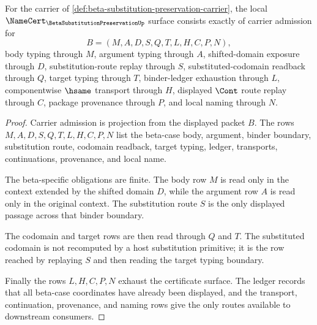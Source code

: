 \begin{theorem}
\label{thm:beta-substitution-preservation-namecert-obligations}
For the carrier of \autoref{def:beta-substitution-preservation-carrier}, the local $\NameCert_{\BetaSubstitutionPreservationUp}$ surface consists exactly of carrier admission for
$$
B=(M,A,D,S,Q,T,L,H,C,P,N),
$$
body typing through $M$, argument typing through $A$, shifted-domain exposure through $D$, substitution-route replay through $S$, substituted-codomain readback through $Q$, target typing through $T$, binder-ledger exhaustion through $L$, componentwise $\hsame$ transport through $H$, displayed $\Cont$ route replay through $C$, package provenance through $P$, and local naming through $N$.
\end{theorem}
\begin{proof}
Carrier admission is projection from the displayed packet $B$. The rows $M,A,D,S,Q,T,L,H,C,P,N$ list the beta-case body, argument, binder boundary, substitution route, codomain readback, target typing, ledger, transports, continuations, provenance, and local name.

The beta-specific obligations are finite. The body row $M$ is read only in the context extended by the shifted domain $D$, while the argument row $A$ is read only in the original context. The substitution route $S$ is the only displayed passage across that binder boundary.

The codomain and target rows are then read through $Q$ and $T$. The substituted codomain is not recomputed by a host substitution primitive; it is the row reached by replaying $S$ and then reading the target typing boundary.

Finally the rows $L,H,C,P,N$ exhaust the certificate surface. The ledger records that all beta-case coordinates have already been displayed, and the transport, continuation, provenance, and naming rows give the only routes available to downstream consumers.
\end{proof}

